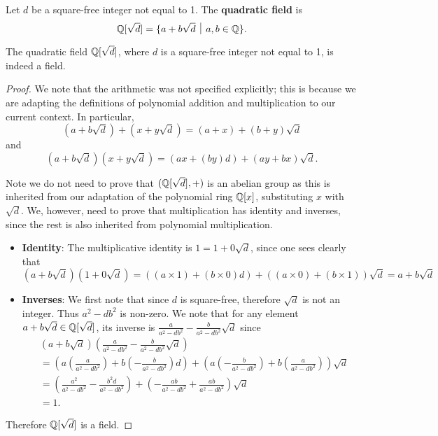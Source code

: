 \begin{definition}
    Let $d$ be a square-free integer not equal to 1. The \textbf{quadratic field} is
    \[
        \Q[\sqrt{d}] = \{a + b\sqrt{d} \vert a,b\in\Q\}.
    \]
\end{definition}
\begin{proposition}
    The quadratic field $\mathbb{Q}[\sqrt{d}]$, where $d$ is a square-free integer not equal to 1, is indeed a field.
\end{proposition}
\begin{proof}
    We note that the arithmetic was not specified explicitly; this is because we are adapting the definitions of polynomial addition and multiplication to our current context. In particular,
    \[
        (a+b\sqrt{d}) + (x + y\sqrt{d}) = (a+x) + (b+y)\sqrt{d}
    \]
    and
    \[
        (a+b\sqrt{d})(x+y\sqrt{d}) = (ax+(by)d) + (ay + bx)\sqrt{d}.
    \]

    Note we do not need to prove that $(\mathbb{Q}[\sqrt{d}], +)$ is an abelian group as this is inherited from our adaptation of the polynomial ring $\mathbb{Q}[x]$, substituting $x$ with $\sqrt{d}$. We, however, need to prove that multiplication has identity and inverses, since the rest is also inherited from polynomial multiplication.

    \begin{itemize}
        \item \textbf{Identity}: The multiplicative identity is $1 = 1 + 0\sqrt{d}$, since one sees clearly that
        \[
            (a+b\sqrt{d})(1+0\sqrt{d}) = ((a\times1) + (b\times0)d) + ((a\times0) + (b \times 1))\sqrt{d} = a + b\sqrt{d}
        \]

        \item \textbf{Inverses}: We first note that since $d$ is square-free, therefore $\sqrt{d}$ is not an integer. Thus $a^2 - db^2$ is non-zero. We note that for any element $a+b\sqrt{d} \in \mathbb{Q}[\sqrt{d}]$, its inverse is $\frac{a}{a^2-db^2} - \frac{b}{a^2-db^2}\sqrt{d}$ since
        \begin{align*}
            &(a+b\sqrt{d})\left(\frac{a}{a^2-db^2} - \frac{b}{a^2-db^2}\sqrt{d}\right)\\
            &= \left(a\left(\frac{a}{a^2-db^2}\right) + b\left(-\frac{b}{a^2-db^2}\right)d\right) + \left(a\left(-\frac{b}{a^2-db^2}\right) + b\left(\frac{a}{a^2-db^2}\right)\right)\sqrt{d}\\
            &=\left(\frac{a^2}{a^2-db^2} -\frac{b^2d}{a^2-db^2}\right) + \left(-\frac{ab}{a^2-db^2} + \frac{ab}{a^2-db^2}\right)\sqrt{d}\\
            &=1.
        \end{align*}
    \end{itemize}

    Therefore $\mathbb{Q}[\sqrt{d}]$ is a field.
\end{proof}

